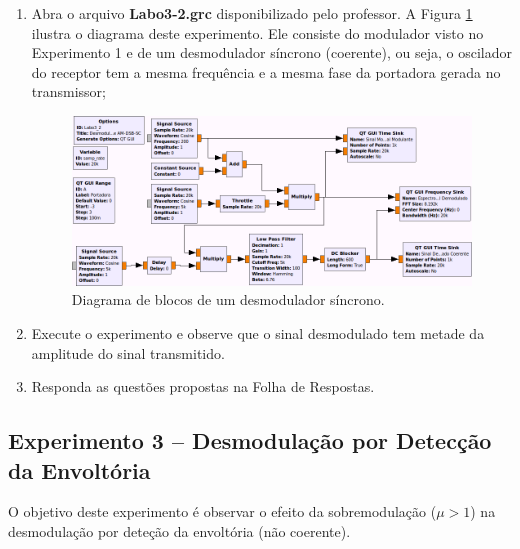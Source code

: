 \documentclass[12pt,addpoints]{exam}
\newcommand{\myscale}{0.4}
\begin{document}
\begin{enumerate}
    \item  Abra o arquivo \textbf{Labo3-2.grc} disponibilizado pelo professor. A Figura \ref{fig:GRC_3-1b} ilustra o diagrama deste experimento. Ele consiste do modulador visto no Experimento 1 e de um desmodulador síncrono (coerente), ou seja, o oscilador do receptor tem a mesma frequência e a mesma fase da portadora gerada no transmissor; 
    \begin{figure}[htb]
        \centering
        \includegraphics[scale=\myscale]{./Figuras/Labo3-2}
        \caption{Diagrama de blocos de um desmodulador síncrono.} 
        \label{fig:GRC_3-1b}
    \end{figure}
  \item Execute o experimento e observe que o sinal desmodulado tem metade da amplitude do sinal transmitido.
  \item Responda as questões propostas na Folha de Respostas.
\end{enumerate}

\subsection{Experimento 3 -- Desmodulação por Detecção da Envoltória}

O objetivo deste experimento é observar o efeito da sobremodulação ($\mu > 1$) na desmodulação por deteção da envoltória (não coerente).
\end{document}

